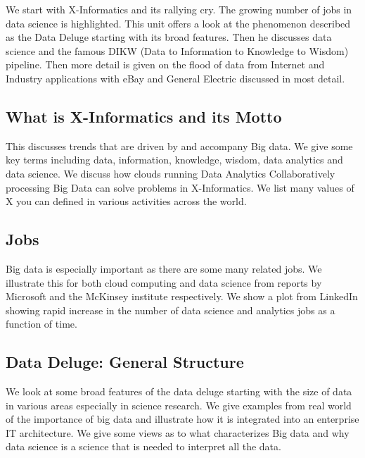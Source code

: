 We start with X-Informatics and its rallying cry. The growing number of
jobs in data science is highlighted. This unit offers a look at the
phenomenon described as the Data Deluge starting with its broad
features. Then he discusses data science and the famous DIKW (Data to
Information to Knowledge to Wisdom) pipeline. Then more detail is given
on the flood of data from Internet and Industry applications with eBay
and General Electric discussed in most detail.




\subsection{What is X-Informatics and its
Motto}\label{what-is-x-informatics-and-its-motto}

This discusses trends that are driven by and accompany Big data. We
give some key terms including data, information, knowledge, wisdom,
data analytics and data science. We discuss how clouds running Data Analytics
Collaboratively processing Big Data can solve problems in
X-Informatics. We list many values of X you can defined in various
activities across the world.






\subsection{Jobs}\label{jobs}

Big data is especially important as there are some many related jobs. We
illustrate this for both cloud computing and data science from reports
by Microsoft and the McKinsey institute respectively. We show a plot
from LinkedIn showing rapid increase in the number of data science and
analytics jobs as a function of time.



\subsection{Data Deluge: General
Structure}\label{data-deluge-general-structure}

We look at some broad features of the data deluge starting with the size
of data in various areas especially in science research. We give
examples from real world of the importance of big data and illustrate
how it is integrated into an enterprise IT architecture. We give some
views as to what characterizes Big data and why data science is a
science that is needed to interpret all the data.


